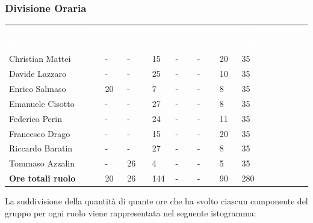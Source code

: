 \subsubsection{Divisione Oraria}
{
	\renewcommand{\arraystretch}{2}
	\centering
	\begin{longtable}{ C{5cm} C{1cm} C{1cm} C{1cm} C{1cm} C{1cm} C{1cm} C{3cm}}
		\textcolor{white}{\textbf{Nome membro del gruppo}} & \textcolor{white}{\textbf{RE}} & \textcolor{white}{\textbf{AM}} & \textcolor{white}{\textbf{AN}} & \textcolor{white}{\textbf{PT}} & \textcolor{white}{\textbf{PR}} & \textcolor{white}{\textbf{VE}} & \textcolor{white}{\textbf{Ore complessive}}\\	
        
        
        Christian Mattei & - & - & 15 & - & - & 20 & 35  \\
        Davide Lazzaro & - & - & 25 & - & - & 10 & 35 \\
        Enrico Salmaso & 20 & - & 7 & - & - & 8 & 35 \\
        Emanuele Cisotto & - & - & 27 & - & - & 8 & 35 \\
        Federico Perin & - & - & 24 & - & - & 11 & 35 \\
        Francesco Drago & - & - & 15 & - & - & 20 & 35  \\
        Riccardo Baratin & - & - & 27 & - & - & 8 & 35 \\
        Tommaso Azzalin & - & 26 & 4 & - & - & 5 & 35 \\
        \textbf{Ore totali ruolo} & 20 & 26 & 144 & - & - & 90 & 280 \\
		
	\end{longtable}
}

La suddivisione della quantità di quante ore che ha svolto ciascun componente del gruppo per ogni ruolo viene rappresentata nel seguente istogramma:

\begin{figure}[h]
\end{figure}

